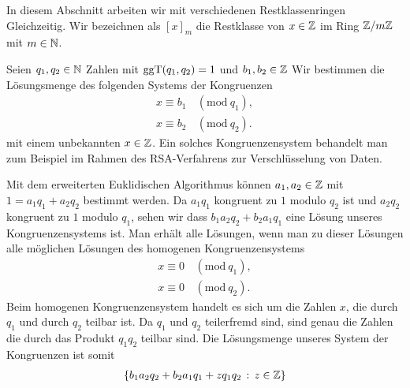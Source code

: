 	In diesem Abschnitt arbeiten wir mit verschiedenen Restklassenringen Gleichzeitig. Wir bezeichnen als $[x]_m$ die Restklasse von $x \in \mathbb Z$ im Ring $\mathbb Z / m \mathbb Z$ mit $m \in \mathbb N$. 
	
	\newcommand{\mymod}[1]{\,(\mathrm{mod} \ #1)}
	\begin{bem}[Kongruenzen]
		Seien $q_1, q_2 \in \mathbb N$ Zahlen mit $\operatorname{ggT}(q_1, q_2) = 1$ und $b_1, b_2 \in \mathbb Z$ Wir bestimmen die Lösungsmenge des folgenden Systems der Kongruenzen
		\begin{align*}
			x \equiv b_1 & \mymod{q_1},
			\\ x \equiv b_2 & \mymod{q_2}.
		\end{align*}
		mit einem unbekannten $x \in \mathbb Z$. Ein solches Kongruenzensystem behandelt man zum Beispiel im Rahmen des RSA-Verfahrens zur Verschlüsselung von Daten.  
		
		Mit dem erweiterten Euklidischen Algorithmus können $a_1, a_2 \in \mathbb Z$ mit $1 = a_1 q_1 + a_2 q_2$ bestimmt werden. Da $a_1 q_1$ kongruent zu $1$ modulo $q_2$ ist und $a_2 q_2$ kongruent zu $1$ modulo $q_1$, sehen wir dass $b_1 a_2 q_2 + b_2 a_1 q_1$ eine Lösung unseres Kongruenzensystems ist. Man erhält alle Lösungen, wenn man zu dieser Lösungen alle möglichen Lösungen des homogenen Kongruenzensystems 
		\begin{align*}
			x \equiv 0 & \mymod{q_1},
			\\ x \equiv 0 & \mymod{q_2}.
		\end{align*}
		Beim homogenen Kongruenzensystem handelt es sich um die Zahlen $x$, die durch $q_1$ und durch $q_2$ teilbar ist. Da $q_1$ und $q_2$ teilerfremd sind, sind genau die Zahlen die durch das Produkt $q_1 q_2$ teilbar sind. Die Lösungsmenge unseres System der Kongruenzen ist somit 
		\begin{align*}
			\{  b_1 a_2 q_2 + b_2 a_1 q_1 + z q_1 q_2  \,:\, z \in \mathbb Z \}
		\end{align*} 
	\end{bem} 
	
